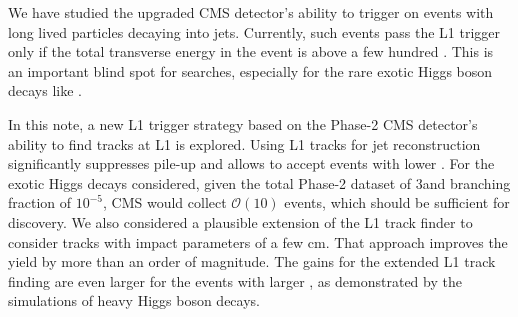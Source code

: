 We have studied the upgraded CMS detector's ability to trigger on events with long lived particles decaying into jets.
Currently, such events pass the L1 trigger only if the total transverse energy in the event is above a few hundred \UGeVns.
This is an important blind spot for searches, especially for the rare exotic Higgs boson decays like
 \Hphiphi.

In this note, a new L1 trigger strategy based on the Phase-2 CMS detector's ability to find tracks at L1 is explored.
Using L1 tracks for jet reconstruction significantly suppresses pile-up and allows to accept events with lower \HT.
For the exotic Higgs decays considered, given the total Phase-2 dataset of 3\abinv and branching fraction of $10^{-5}$, 
CMS would collect $\mathcal{O}(10)$ events, which should be sufficient for discovery.
We also considered a plausible extension of the L1 track finder to consider tracks with impact parameters of a few cm.
That approach improves the yield by more than an order of magnitude. The gains for the extended L1 track finding
are even larger for the events with larger \HT, as demonstrated by the simulations of heavy Higgs boson decays.

